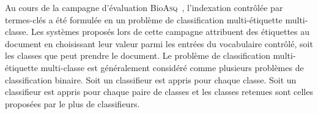     Au cours de la campagne d'évaluation
    Bio\textsc{Asq}~\cite{partalas2013bioasq}, l'indexation contrôlée par
    termes-clés a été formulée en un problème de classification multi-étiquette
    multi-classe. Les systèmes proposés lors de cette campagne attribuent des
    étiquettes au document en choisissant leur valeur parmi les entrées du
    vocabulaire contrôlé, soit les classes que peut prendre le document. Le
    problème de classification multi-étiquette multi-classe est généralement
    considéré comme plusieurs problèmes de classification binaire. Soit un
    classifieur est appris pour chaque classe. Soit un classifieur est appris
    pour chaque paire de classes et les classes retenues sont celles proposées
    par le plus de classifieurs.


